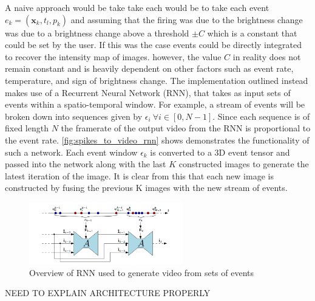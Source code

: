 A naive approach would be take take each would be to take each event $ e_k = (\boldsymbol{\mathbf{x}}_k, t_l, p_k ) $ and assuming that the firing was due to the brightness change was due to a brightness change above a threshold $ \pm C $ which is a constant that could be set by the user. If this was the case events could be directly integrated to recover the intensity map of images. however, the value $ C $ in reality does not remain constant and is heavily dependent on other factors such as event rate, temperature, and sign of brightness change. The implementation outlined instead makes use of a Recurrent Neural Network (RNN), that takes as input sets of events within a spatio-temporal window. For example, a stream of events will be broken down into sequences given by $ \epsilon_i \: \forall i \in [0, N-1] $. Since each sequence is of fixed length $ N $ the framerate of the output video from the RNN is proportional to the event rate. \autoref{fig:spikes_to_video_rnn} shows demonstrates the functionality of such a network. Each event window $ \epsilon_k $ is converted to a 3D event tensor and passed into the network along with the last $ K $ constructed images to generate the latest iteration of the image. It is clear from this that each new image is constructed by fusing the previous K images with the new stream of events.

\begin{figure}[htb]
      \centering
      \includegraphics[width=0.6\textwidth]{background/images/spikes_to_video_rnn.png}
      \caption{Overview of RNN used to generate video from sets of events\cite{spikingToVideo}}
      \label{fig:spikes_to_video_rnn}
\end{figure}

\color{red} NEED TO EXPLAIN ARCHITECTURE PROPERLY\cite{spikingToVideo} \color{black}